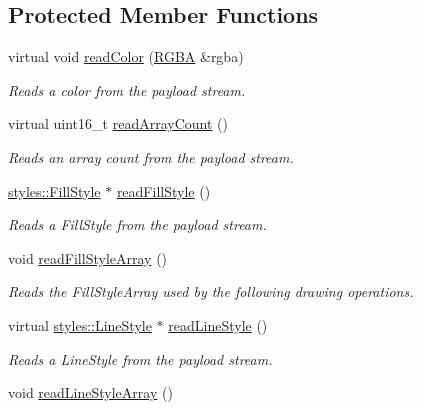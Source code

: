 \subsection*{Protected Member Functions}
\begin{DoxyCompactItemize}
\item 
virtual void \hyperlink{classjswf_1_1flash_1_1tags_1_1_define_shape_tag_ad6886a89c251b532eecd1edf306943c1}{read\+Color} (\hyperlink{structjswf_1_1flash_1_1_r_g_b_a}{R\+G\+B\+A} \&rgba)
\begin{DoxyCompactList}\small\item\em Reads a color from the payload stream. \end{DoxyCompactList}\item 
virtual uint16\+\_\+t \hyperlink{classjswf_1_1flash_1_1tags_1_1_define_shape_tag_a46f74909f7c7c63f5e9663a2465adc18}{read\+Array\+Count} ()
\begin{DoxyCompactList}\small\item\em Reads an array count from the payload stream. \end{DoxyCompactList}\item 
\hyperlink{classjswf_1_1flash_1_1styles_1_1_fill_style}{styles\+::\+Fill\+Style} $\ast$ \hyperlink{classjswf_1_1flash_1_1tags_1_1_define_shape_tag_a4608b4e2716301637136fbbd1c5040ab}{read\+Fill\+Style} ()
\begin{DoxyCompactList}\small\item\em Reads a Fill\+Style from the payload stream. \end{DoxyCompactList}\item 
void \hyperlink{classjswf_1_1flash_1_1tags_1_1_define_shape_tag_a8688b9a3f2873e816a16e5450e4df167}{read\+Fill\+Style\+Array} ()
\begin{DoxyCompactList}\small\item\em Reads the Fill\+Style\+Array used by the following drawing operations. \end{DoxyCompactList}\item 
virtual \hyperlink{classjswf_1_1flash_1_1styles_1_1_line_style}{styles\+::\+Line\+Style} $\ast$ \hyperlink{classjswf_1_1flash_1_1tags_1_1_define_shape_tag_aecc1cc8ae869cd1bce8ec793c4c8124e}{read\+Line\+Style} ()
\begin{DoxyCompactList}\small\item\em Reads a Line\+Style from the payload stream. \end{DoxyCompactList}\item 
void \hyperlink{classjswf_1_1flash_1_1tags_1_1_define_shape_tag_ab15f7758c79bbb08f1804eebcb7488da}{read\+Line\+Style\+Array} ()

\end{DoxyCompactItemize}
